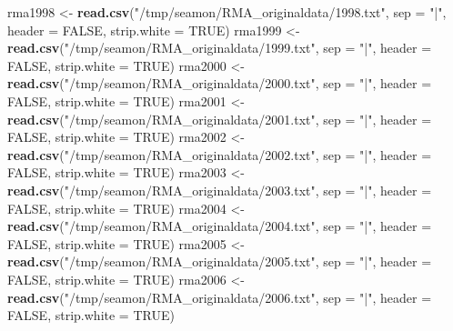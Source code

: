 \documentclass[]{article}
\newenvironment{Shaded}{\begin{snugshade}}{\end{snugshade}}
\newcommand{\DataTypeTok}[1]{\textcolor[rgb]{0.13,0.29,0.53}{#1}}
\newcommand{\KeywordTok}[1]{\textcolor[rgb]{0.13,0.29,0.53}{\textbf{#1}}}
\newcommand{\NormalTok}[1]{#1}
\newcommand{\OtherTok}[1]{\textcolor[rgb]{0.56,0.35,0.01}{#1}}
\newcommand{\StringTok}[1]{\textcolor[rgb]{0.31,0.60,0.02}{#1}}
\begin{document}
\begin{Shaded}
\begin{Highlighting}[]
\NormalTok{rma1998 <-}\StringTok{ }\KeywordTok{read.csv}\NormalTok{(}\StringTok{"/tmp/seamon/RMA_originaldata/1998.txt"}\NormalTok{, }\DataTypeTok{sep =} \StringTok{"|"}\NormalTok{, }\DataTypeTok{header =} \OtherTok{FALSE}\NormalTok{, }\DataTypeTok{strip.white =} \OtherTok{TRUE}\NormalTok{)}
\NormalTok{rma1999 <-}\StringTok{ }\KeywordTok{read.csv}\NormalTok{(}\StringTok{"/tmp/seamon/RMA_originaldata/1999.txt"}\NormalTok{, }\DataTypeTok{sep =} \StringTok{"|"}\NormalTok{, }\DataTypeTok{header =} \OtherTok{FALSE}\NormalTok{, }\DataTypeTok{strip.white =} \OtherTok{TRUE}\NormalTok{)}
\NormalTok{rma2000 <-}\StringTok{ }\KeywordTok{read.csv}\NormalTok{(}\StringTok{"/tmp/seamon/RMA_originaldata/2000.txt"}\NormalTok{, }\DataTypeTok{sep =} \StringTok{"|"}\NormalTok{, }\DataTypeTok{header =} \OtherTok{FALSE}\NormalTok{, }\DataTypeTok{strip.white =} \OtherTok{TRUE}\NormalTok{)}
\NormalTok{rma2001 <-}\StringTok{ }\KeywordTok{read.csv}\NormalTok{(}\StringTok{"/tmp/seamon/RMA_originaldata/2001.txt"}\NormalTok{, }\DataTypeTok{sep =} \StringTok{"|"}\NormalTok{, }\DataTypeTok{header =} \OtherTok{FALSE}\NormalTok{, }\DataTypeTok{strip.white =} \OtherTok{TRUE}\NormalTok{)}
\NormalTok{rma2002 <-}\StringTok{ }\KeywordTok{read.csv}\NormalTok{(}\StringTok{"/tmp/seamon/RMA_originaldata/2002.txt"}\NormalTok{, }\DataTypeTok{sep =} \StringTok{"|"}\NormalTok{, }\DataTypeTok{header =} \OtherTok{FALSE}\NormalTok{, }\DataTypeTok{strip.white =} \OtherTok{TRUE}\NormalTok{)}
\NormalTok{rma2003 <-}\StringTok{ }\KeywordTok{read.csv}\NormalTok{(}\StringTok{"/tmp/seamon/RMA_originaldata/2003.txt"}\NormalTok{, }\DataTypeTok{sep =} \StringTok{"|"}\NormalTok{, }\DataTypeTok{header =} \OtherTok{FALSE}\NormalTok{, }\DataTypeTok{strip.white =} \OtherTok{TRUE}\NormalTok{)}
\NormalTok{rma2004 <-}\StringTok{ }\KeywordTok{read.csv}\NormalTok{(}\StringTok{"/tmp/seamon/RMA_originaldata/2004.txt"}\NormalTok{, }\DataTypeTok{sep =} \StringTok{"|"}\NormalTok{, }\DataTypeTok{header =} \OtherTok{FALSE}\NormalTok{, }\DataTypeTok{strip.white =} \OtherTok{TRUE}\NormalTok{)}
\NormalTok{rma2005 <-}\StringTok{ }\KeywordTok{read.csv}\NormalTok{(}\StringTok{"/tmp/seamon/RMA_originaldata/2005.txt"}\NormalTok{, }\DataTypeTok{sep =} \StringTok{"|"}\NormalTok{, }\DataTypeTok{header =} \OtherTok{FALSE}\NormalTok{, }\DataTypeTok{strip.white =} \OtherTok{TRUE}\NormalTok{)}
\NormalTok{rma2006 <-}\StringTok{ }\KeywordTok{read.csv}\NormalTok{(}\StringTok{"/tmp/seamon/RMA_originaldata/2006.txt"}\NormalTok{, }\DataTypeTok{sep =} \StringTok{"|"}\NormalTok{, }\DataTypeTok{header =} \OtherTok{FALSE}\NormalTok{, }\DataTypeTok{strip.white =} \OtherTok{TRUE}\NormalTok{)}

\end{Highlighting}
\end{Shaded}
\end{document}
